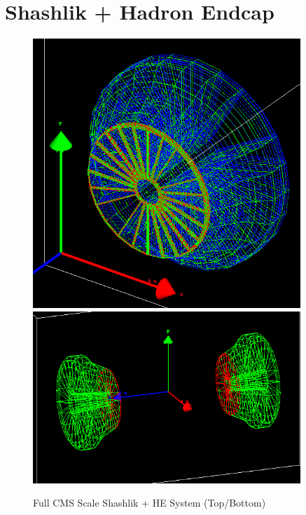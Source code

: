\section{Shashlik + Hadron Endcap} \label{section:simulations_shashlik}
\begin{figure}[hbp]
    \centering
    \includegraphics[width=0.9\textwidth]{figures/ch_simulations/shashlik/geometry/Shashlik+HE_Complete_Wire.png}
    \includegraphics[width=0.9\textwidth]{figures/ch_simulations/shashlik/geometry/SHE_70_20.png}
    \caption{Full CMS Scale Shashlik + HE System (Top/Bottom)}
    \label{fig:higgs_simulations_shashlikexamples}
 \end{figure}

